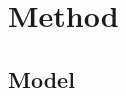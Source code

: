 \documentclass{ametsocV5}
\begin{document}



%
%

\section{Method}

\subsection{Model}
\end{document}
